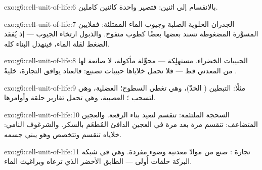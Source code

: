 \begin{solution}{exo:g6:cell-unit-of-life:6}
بالانقسام إلى اثنين: فتصير  واحدة كائنين كاملين.
\end{solution}

\begin{solution}{exo:g6:cell-unit-of-life:7}
الجدران الخلوية الصلبة وجيوب الماء الممتلئة: فملايين 
المسوَّرة المضغوطة تسند بعضها بعضًا كطوب منفوخ. والذبول ارتخاء
الجيوب --- إذ يُفقد الضغط لقلة الماء، فينهدل البناء كله.
\end{solution}

\begin{solution}{exo:g6:cell-unit-of-life:8}
الحبيبات الخضراء.  مستهلِكة --- محوِّلة 
مأكولة، لا صانعة لها من المعدني قط --- فلا تحمل خلاياها حبيبات
تصنيع: فالعتاد يوافق التجارة، خليةً .
\end{solution}

\begin{solution}{exo:g6:cell-unit-of-life:9}
مثلًا:  التبطين ( الخدّ)، وهي تغطي السطوح؛ 
العضلية، وهي  لتسحب ؛  العصبية، وهي تحمل تقارير
حلقة  وأوامرها.
\end{solution}

\begin{solution}{exo:g6:cell-unit-of-life:10}
السحجة الملتئمة:   تنقسم لتعيد بناء الرقعة. والعجين
المتضاعف:   تنقسم مرة بعد مرة في العجين الدافئ
المُطعَم بالسكر. والشرغوف النامي: خلاياه تنقسم وتتخصص وهو يبني
جسمه.
\end{solution}

\begin{solution}{exo:g6:cell-unit-of-life:11}
تجارة : صنع  من موادّ معدنية وضوء  مفردة.
وهي في شبكة البركة حلقات أُولى --- الطابق الأخضر الذي ترعاه
 وبراغيث الماء.
\end{solution}

